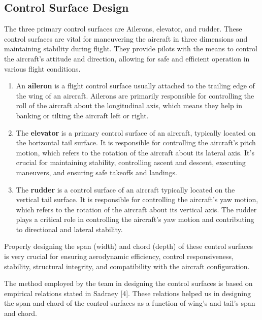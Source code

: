 \documentclass[12 pt]{article}
\begin{document}
{{\subsection{Control Surface Design}
The three primary control surfaces are Ailerons, elevator, and rudder. These control surfaces are vital for maneuvering the aircraft in three dimensions and maintaining stability during flight. They provide pilots with the means to control the aircraft’s attitude and direction, allowing for safe and efficient operation in various flight conditions.

\begin{enumerate}
    \item An \textbf{aileron} is a flight control surface usually attached to the trailing edge of the wing of an aircraft. Ailerons are primarily responsible for controlling the roll of the aircraft about the longitudinal axis, which means they help in banking or tilting the aircraft left or right.
    \item The \textbf{elevator} is a primary control surface of an aircraft, typically located on the horizontal tail surface. It is responsible for controlling the aircraft’s pitch motion, which refers to the rotation of the aircraft about its lateral axis. It’s crucial for maintaining stability, controlling ascent and descent, executing maneuvers, and ensuring safe takeoffs and landings.
    \item The \textbf{rudder} is a control surface of an aircraft typically located on the vertical tail surface. It is responsible for controlling the aircraft’s yaw motion, which refers to the rotation of the aircraft about its vertical axis. The rudder plays a critical role in controlling the aircraft’s yaw motion and contributing to directional and lateral stability.
\end{enumerate}

Properly designing the span (width) and chord (depth) of these control surfaces is very crucial for ensuring aerodynamic efficiency, control responsiveness, stability, structural integrity, and compatibility with the aircraft configuration.

The method employed by the team in designing the control surfaces is based on empirical relations stated in Sadraey [4]. These relations helped us in designing the span and chord of the control surfaces as a function of wing’s and tail’s span and chord.

}}
\end{document}
